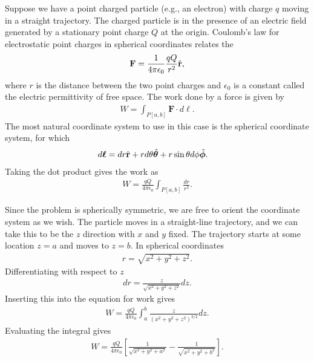 Suppose we have a point charged particle (e.g., an electron) with charge $q$ moving in a straight trajectory. The charged particle is in the presence of an electric field generated by a stationary point charge $Q$ at the origin. Coulomb's law for electrostatic point charges in spherical coordinates relates the 
\begin{align}
  \mathbf{F} = \frac{1}{4 \pi \epsilon_0} \frac{qQ}{r^2} \hat{\mathbf{r}},
\end{align}
where $r$ is the distance between the two point charges and $\epsilon_0$ is a constant called the electric permittivity of free space. The work done by a force is given by
\begin{align}
  W = \int_{P[a,b]} \mathbf{F} \cdot d\boldsymbol\ell .
\end{align}
The most natural coordinate system to use in this case is the spherical coordinate system, for which
\begin{align}
  d\boldsymbol\ell &= dr \hat{\mathbf{r}} + r d\theta \hat{\boldsymbol\theta} + r \sin \theta d\phi \hat{\boldsymbol\phi} . \nonumber
\end{align}
Taking the dot product gives the work as
\begin{align}
   W = \frac{qQ}{4 \pi \epsilon_0} \int_{P[a,b]} \frac{dr}{r^2} .
\end{align}

Since the problem is spherically symmetric, we are free to orient the coordinate system as we wish. The particle moves in a straight-line trajectory, and we can take this to be the $z$ direction with $x$ and $y$ fixed. The trajectory starts at some location $z = a$ and moves to $z = b$. In spherical coordinates
\begin{align}
  r = \sqrt{ x^2 + y^2 + z^2 } . \nonumber
\end{align}
Differentiating with respect to $z$
\begin{align}
  dr = \frac{z}{\sqrt{ x^2 + y^2 + z^2 }} dz .
\end{align}
Inserting this into the equation for work gives
\begin{align}
   W = \frac{qQ}{4 \pi \epsilon_0} \int_a^b \frac{z}{(x^2 + y^2 + z^2)^{3/2}} dz.
\end{align}
Evaluating the integral gives
\begin{align}
   W = \frac{qQ}{4 \pi \epsilon_0} \left[ \frac{1}{\sqrt{x^2 + y^2 + a^2}} - \frac{1}{\sqrt{x^2 + y^2 + b^2}} \right].
\end{align}


